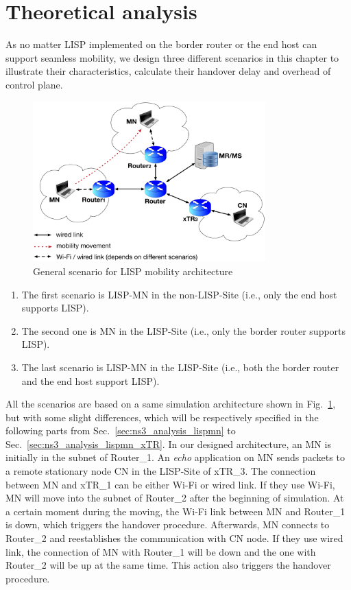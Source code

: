 \section{Theoretical analysis}
\label{sec:ns3_analysis}
As no matter LISP implemented on the border router or the end host can support seamless mobility, we design three different scenarios in this chapter to illustrate their characteristics, calculate their handover delay and overhead of control plane. 
\begin{figure}[!th]
	\centering
	\includegraphics[width=0.8\textwidth]{Pics/LISP_mobility_archi}
	\caption{General scenario for LISP mobility architecture}
	\label{sim_archi}
\end{figure}
\begin{enumerate}[noitemsep,topsep=0pt]
	\item The first scenario is LISP-MN in the non-LISP-Site (i.e., only the end host supports LISP). 
	\item The second one is MN in the LISP-Site (i.e., only the border router supports LISP). 
	\item The last scenario is LISP-MN in the LISP-Site (i.e., both the border router and the end host support LISP). 
\end{enumerate}	
All the scenarios are based on a same simulation architecture shown in Fig.~\ref{sim_archi}, but with some slight differences, which will be respectively specified in the following parts from Sec.~\ref{sec:ns3_analysis_lispmn} to Sec.~\ref{sec:ns3_analysis_lispmn_xTR}. In our designed architecture, an MN is initially in the subnet of Router\_1. An \emph{echo} application on MN sends packets to a remote stationary node CN in the LISP-Site of xTR\_3. The connection between MN and xTR\_1 can be either Wi-Fi or wired link. If they use Wi-Fi, MN will move into the subnet of Router\_2 after the beginning of simulation. At a certain moment during the moving, the Wi-Fi link between MN and Router\_1 is down, which triggers the handover procedure. Afterwards, MN connects to Router\_2 and reestablishes the communication with CN node. If they use wired link, the connection of MN with Router\_1 will be down and the one with Router\_2 will be up at the same time. This action also triggers the handover procedure.

